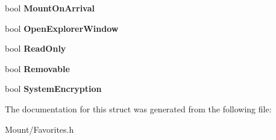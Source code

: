 \begin{DoxyCompactItemize}
bool {\bfseries Mount\+On\+Arrival}
\item 
\mbox{\label{struct_gost_crypt_1_1_favorite_volume_adc5ba03a3fe01f300eb8033c326dfe64}} 
bool {\bfseries Open\+Explorer\+Window}
\item 
\mbox{\label{struct_gost_crypt_1_1_favorite_volume_ab6229a1dde46b8760a2bcfcb3caae28b}} 
bool {\bfseries Read\+Only}
\item 
\mbox{\label{struct_gost_crypt_1_1_favorite_volume_a505d5388226659ddb86faf7c3130b458}} 
bool {\bfseries Removable}
\item 
\mbox{\label{struct_gost_crypt_1_1_favorite_volume_aa46d95ddf9d61bda56834e6322aeeef1}} 
bool {\bfseries System\+Encryption}
\end{DoxyCompactItemize}


The documentation for this struct was generated from the following file\+:\begin{DoxyCompactItemize}
\item 
Mount/Favorites.\+h\end{DoxyCompactItemize}
